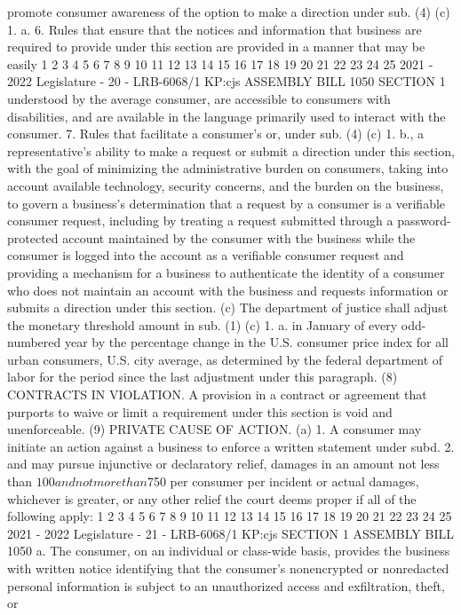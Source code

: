 promote consumer awareness of the option to make a direction under sub. (4) (c) 1.
a.
6. Rules that ensure that the notices and information that business are
required to provide under this section are provided in a manner that may be easily
1
2
3
4
5
6
7
8
9
10
11
12
13
14
15
16
17
18
19
20
21
22
23
24
25
2021 - 2022 Legislature - 20 - LRB-6068/1
KP:cjs
 ASSEMBLY BILL 1050 SECTION 1
understood by the average consumer, are accessible to consumers with disabilities,
and are available in the language primarily used to interact with the consumer.
7. Rules that facilitate a consumer's or, under sub. (4) (c) 1. b., a representative's
ability to make a request or submit a direction under this section, with the goal of
minimizing the administrative burden on consumers, taking into account available
technology, security concerns, and the burden on the business, to govern a business's
determination that a request by a consumer is a verifiable consumer request,
including by treating a request submitted through a password-protected account
maintained by the consumer with the business while the consumer is logged into the
account as a verifiable consumer request and providing a mechanism for a business
to authenticate the identity of a consumer who does not maintain an account with
the business and requests information or submits a direction under this section.
(c) The department of justice shall adjust the monetary threshold amount in
sub. (1) (c) 1. a. in January of every odd-numbered year by the percentage change
in the U.S. consumer price index for all urban consumers, U.S. city average, as
determined by the federal department of labor for the period since the last
adjustment under this paragraph.
(8) CONTRACTS IN VIOLATION. A provision in a contract or agreement that
purports to waive or limit a requirement under this section is void and
unenforceable.
(9) PRIVATE CAUSE OF ACTION. (a) 1. A consumer may initiate an action against
a business to enforce a written statement under subd. 2. and may pursue injunctive
or declaratory relief, damages in an amount not less than $100 and not more than
$750 per consumer per incident or actual damages, whichever is greater, or any other
relief the court deems proper if all of the following apply:
1
2
3
4
5
6
7
8
9
10
11
12
13
14
15
16
17
18
19
20
21
22
23
24
25
2021 - 2022 Legislature - 21 - LRB-6068/1
KP:cjs
SECTION 1 ASSEMBLY BILL 1050
a. The consumer, on an individual or class-wide basis, provides the business
with written notice identifying that the consumer's nonencrypted or nonredacted
personal information is subject to an unauthorized access and exfiltration, theft, or
